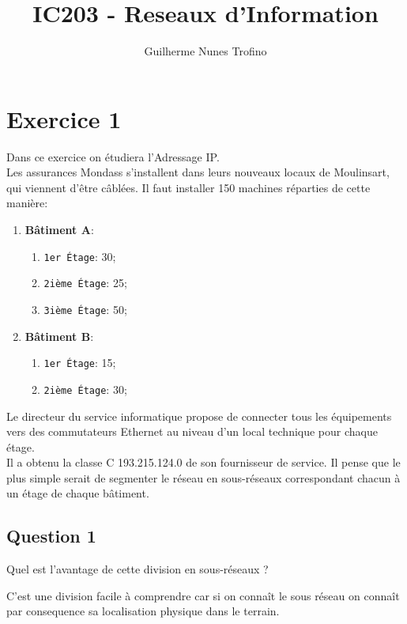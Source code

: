 \documentclass{article}
\title{IC203 - Reseaux d'Information}
\author{Guilherme Nunes Trofino}
\begin{document}
\maketitle
\setlength{\parindent}{0pt}



\section*{Exercice 1}
\noindent Dans ce exercice on étudiera l'Adressage IP.\\

Les assurances Mondass s'installent dans leurs nouveaux locaux de Moulinsart, qui viennent d'être câblées. Il faut installer 150 machines réparties de cette manière:
\begin{enumerate}
    \item \textbf{Bâtiment A}:
    \begin{enumerate}[noitemsep]
        \item \texttt{1er Étage}: 30;
        \item \texttt{2ième Étage}: 25;
        \item \texttt{3ième Étage}: 50;
    \end{enumerate}
    
    \item \textbf{Bâtiment B}:
    \begin{enumerate}[noitemsep]
        \item \texttt{1er Étage}: 15;
        \item \texttt{2ième Étage}: 30;
    \end{enumerate}
\end{enumerate}
Le directeur du service informatique propose de connecter tous les équipements vers des commutateurs Ethernet au niveau d'un local technique pour chaque étage.\\

Il a obtenu la classe C 193.215.124.0 de son fournisseur de service. Il pense que le plus simple serait de segmenter le réseau en sous-réseaux correspondant chacun à un étage de chaque bâtiment.


\subsection*{Question 1}
\begin{exercise}
    Quel est l'avantage de cette division en sous-réseaux ?
\end{exercise}
\begin{resolution}
    C'est une division facile à comprendre car si on connaît le sous réseau on connaît par consequence sa localisation physique dans le terrain.
\end{resolution}
\end{document}

